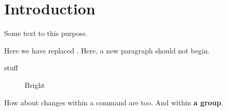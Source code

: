 \section{Introduction}

Some text  to this purpose.

Here we have replaced .
Here, a new paragraph should not begin.

\begin{table}
    \caption{ stuff}
\end{table}

\begin{figure}[tb]
    \caption{Bright }
\end{figure}

How about changes within a command are \textit{} too.
And within {\bfseries a  group}.